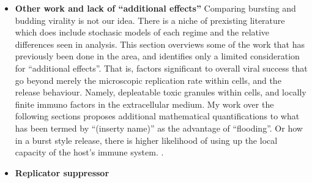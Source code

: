 \begin{itemize}

\item \textbf{Other work and lack of ``additional effects''}
Comparing bursting and budding virality is not our idea. There is a niche of prexisting literature which does include stochasic models of each regime and the relative differences seen in analysis. This section overviews some of the work that has previously been done in the area, and identifies only a limited consideration for ``additional effects''. That is, factors significant to overall viral success that go beyond merely the microscopic replication rate within cells, and the release behaviour. Namely, depleatable toxic granules within cells, and locally finite immuno factors in the extracellular medium. My work over the following sections proposes additional mathematical quantifications to what has been termed by ``(inserty name)'' as the advantage of ``flooding''. Or how in a burst style release, there is higher likelihood of using up the local capacity of the host's immune system.   \cite{williams2021stochastic}
\cite{williams2024reproduction}
\cite{carruthers2020stochastic}
\cite{gillard2014modeling}
\cite{garoff1998virus}
\cite{golovliov2003attenuated}
\cite{jones2012subversion}
\cite{cowley2011immunity}
\cite{ribeiro2002vdt}
\cite{ribeiro2010estimation}
\cite{deboer2012our}
\cite{perelson1999mathematical}
\cite{perelson1996hiv}
\cite{bird2015escape}
\cite{bird2015nonlytic}
\cite{perelson2018introduction}
\cite{wood2014dose}
\cite{ciupe2017host}
\cite{conway2018modeling}
\cite{komarova2007viral}
\cite{anderson1988role}
\cite{beauchemin2011review}
\cite{rong2013analysis}
\cite{guedj2013modeling}
\cite{nelson2004age}
\cite{brown2006intracellular}
\cite{kitagawa2018pde}
\cite{conway2018modeling}
\cite{di2008note}
\cite{stirzaker2006processes}
\cite{capistran2018extracellular}
\cite{ciupe2024incorporating}
\cite{brockwell1986extinction}.




\item \textbf{Replicator suppressor}


\end{itemize}
